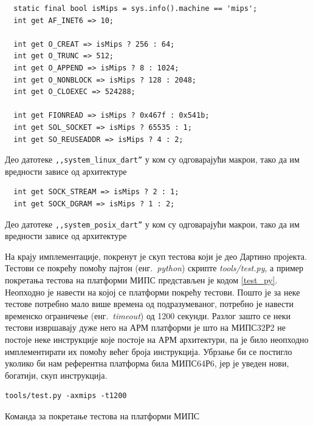 \documentclass[12pt,oneside]{memoir}
\begin{document}
\begin{listing}
\begin{verbatim}
  static final bool isMips = sys.info().machine == 'mips';
  int get AF_INET6 => 10;

  int get O_CREAT => isMips ? 256 : 64;
  int get O_TRUNC => 512;
  int get O_APPEND => isMips ? 8 : 1024;
  int get O_NONBLOCK => isMips ? 128 : 2048;
  int get O_CLOEXEC => 524288;

  int get FIONREAD => isMips ? 0x467f : 0x541b;
  int get SOL_SOCKET => isMips ? 65535 : 1;
  int get SO_REUSEADDR => isMips ? 4 : 2;
\end{verbatim}
\caption{Део датотеке \texttt{,,system\_linux\_dart''} у ком су одговарајући макрои, тако да им вредности зависе од архитектуре}
\label{system_linux_dart}
\end{listing}

\begin{listing}
\begin{verbatim}
  int get SOCK_STREAM => isMips ? 2 : 1;
  int get SOCK_DGRAM => isMips ? 1 : 2;
\end{verbatim}
\caption{Део датотеке \texttt{,,system\_posix\_dart''} у ком су одговарајући макрои, тако да им вредности зависе од архитектуре}
\label{system_posix_dart}
\end{listing}

На крају имплементације, покренут је скуп тестова који је део Дартино пројекта. Тестови се покрећу помоћу пајтон (енг.~\textit{python}) скрипте \textit{tools/test.py}, а пример покретања тестова на платформи МИПС представљен је кодом \ref{test_py}. Неопходно је навести на којој се платформи покрећу тестови. Пошто је за неке тестове потребно мало више времена од подразумеваног, потребно је навести временско ограничење (енг.~\textit{timeout}) од 1200 секунди. Разлог зашто се неки тестови извршавају дуже него на АРМ платформи је што на МИПС32Р2 не постоје неке инструкције које постоје на АРМ архитектури, па је било неопходно имплементирати их помоћу већег броја инструкција. Убрзање би се постигло уколико би нам референтна платформа била МИПС64Р6, јер је уведен нови, богатији, скуп инструкција.\\

\begin{listing}
\begin{verbatim}
tools/test.py -axmips -t1200
\end{verbatim}
\caption{Команда за покретање тестова на платформи МИПС}
\label{test_py}
\end{listing}
\end{document}

